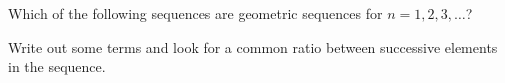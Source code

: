 \documentclass{ximera}
\author{Bart Snapp}
\begin{document}
\begin{exercise}

  Which of the following sequences are geometric sequences for
  $n=1,2,3,\dots$?
  \begin{selectAll}
  \end{selectAll}
  \begin{hint}
   Write out some terms and look for a common ratio between successive elements in the sequence. 
  \end{hint}




\end{exercise}
\end{document}
